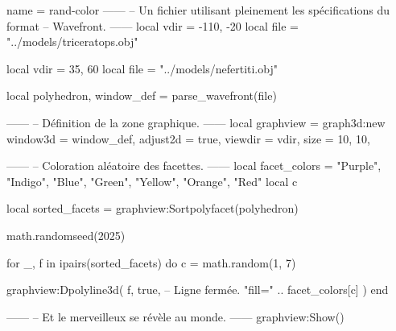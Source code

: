 \documentclass{standalone}
\begin{document}
\begin{luadraw}{name = rand-color}
------
-- Un fichier utilisant pleinement les spécifications du format
-- Wavefront.
------
local vdir = {-110, -20}
local file = "../models/triceratops.obj"

local vdir = {35, 60}
local file = "../models/nefertiti.obj"

local polyhedron, window_def = parse_wavefront(file)

------
-- Définition de la zone graphique.
------
local graphview = graph3d:new{
  window3d = window_def,
  adjust2d = true,
  viewdir  = vdir,
  size     = {10, 10},
}

------
-- Coloration aléatoire des facettes.
------
local facet_colors = {"Purple", "Indigo", "Blue", "Green", "Yellow", "Orange", "Red"}
local c

local sorted_facets = graphview:Sortpolyfacet(polyhedron)

math.randomseed(2025)

for _, f in ipairs(sorted_facets) do
  c = math.random(1, 7)

  graphview:Dpolyline3d(
    f,
    true,  -- Ligne fermée.
    "fill=" .. facet_colors[c]
  )
end

------
-- Et le merveilleux se révèle au monde.
------
graphview:Show()
\end{luadraw}
\end{document}
